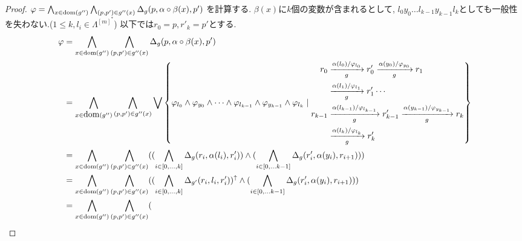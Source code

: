 \documentclass[uplatex,dvipdfmx,a4j]{jsreport}
\begin{document}
  \begin{proof}
    $\varphi = \bigwedge_{x \in \scriptsize \mbox{dom}(g'')} \bigwedge_{(p, p') \in g''(x)}
      \Delta_g(p, \alpha \circ \beta (x), p')$
    を計算する.
    $\beta(x)$に$k$個の変数が含まれるとして,
    $l_0y_0 \ldots l_{k - 1}y_{k - 1}l_k$としても一般性を失わない.($1 \leq k, l_i \in \Lambda^{[m]^*}$)
    以下では$r_0 = p, r'_k = p'$とする.
    \begin{align*}
      \varphi &= \bigwedge_{x \in \scriptsize \dom(g'')} \bigwedge_{(p, p') \in g''(x)}
                  \Delta_g(p, \alpha \circ \beta (x), p')  \\
              &= \bigwedge_{x \in \dom(g'')} \bigwedge_{(p, p') \in g''(x)}
                  \bigvee \left\{
                  \varphi_{l_0} \land \varphi_{y_0} \land \cdots
                  \land \varphi_{l_{k - 1}} \land \varphi_{y_{k - 1}} \land \varphi_{l_k}
                  \mid
                    \begin{aligned}
                      r_0 &\transarrow{\alpha(l_0) / \varphi_{l_0}}{g} r'_0
                        \transarrow{\alpha(y_0) / \varphi_{y_0}}{g} r_1  \\
                        &\transarrow{\alpha(l_1) / \varphi_{l_1}}{g} r'_1 \cdots \\
                        r_{k - 1} &\transarrow{\alpha(l_{k - 1}) / \varphi_{l_{k - 1}}}{g} r'_{k - 1}
                        \transarrow{\alpha(y_{k - 1}) / \varphi_{y_{k - 1}}}{g} r_k \\
                        &\transarrow{\alpha(l_k) / \varphi_{l_k}}{g} r'_k
                    \end{aligned}
                  \right\} \\
              &= \bigwedge_{x \in \scriptsize \dom(g'')} \bigwedge_{(p, p') \in g''(x)}
                  (
                  (\bigwedge_{i \in [0, \ldots, k]} \Delta_g(r_i, \alpha(l_i), r'_i)) \land
                  (\bigwedge_{i \in [0, \ldots k - 1]} \Delta_g(r'_i, \alpha(y_i), r_{i + 1}))
                  )  \\
              &= \bigwedge_{x \in \scriptsize \dom(g'')} \bigwedge_{(p, p') \in g''(x)}
                  (
                  (\bigwedge_{i \in [0, \ldots, k]} \Delta_{g'}(r_i, l_i, r'_i))^\uparrow \land
                  (\bigwedge_{i \in [0, \ldots k - 1]} \Delta_g(r'_i, \alpha(y_i), r_{i + 1}))
                  )  \\
              &= \bigwedge_{x \in \scriptsize \dom(g'')} \bigwedge_{(p, p') \in g''(x)}
                  (

\end{align*}
\end{proof}
\end{document}
